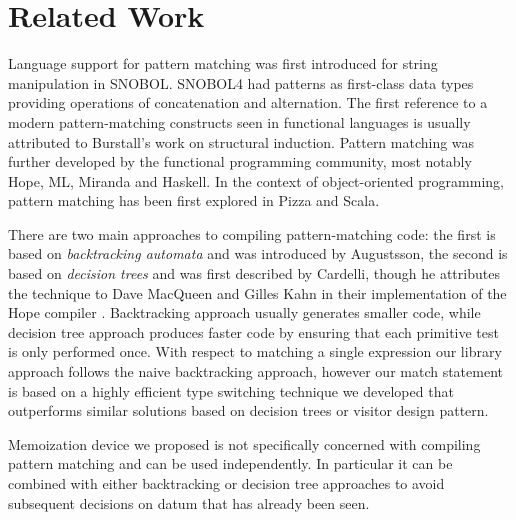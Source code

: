 \section{Related Work} %
\label{sec:rw}

Language support for pattern matching was first introduced for string 
manipulation in SNOBOL\cite{SNOBOL64}. SNOBOL4 had patterns as first-class data 
types providing operations of concatenation and alternation\cite{SNOBOL71}. The 
first reference to a modern pattern-matching constructs seen in functional 
languages is usually attributed to Burstall's work on structural 
induction\cite{Burstall69provingproperties}. Pattern matching was further 
developed by the functional programming community, most notably 
Hope\cite{BMS80}, ML\cite{ML90}, Miranda\cite{Miranda85} and 
Haskell\cite{Haskell98Book}. In the context of object-oriented programming, 
pattern matching has been first explored in Pizza\cite{Odersky97pizzainto} and 
Scala\cite{Scala2nd,EmirThesis}.

There are two main approaches to compiling pattern-matching code: the first is 
based on \emph{backtracking automata} and was introduced by Augustsson\cite{Augustsson85}, 
the second is based on \emph{decision trees} and was first described by 
Cardelli\cite{Cardelli84}, though he attributes the technique to Dave MacQueen 
and Gilles Kahn in their implementation of the Hope compiler \cite{BMS80}.
Backtracking approach usually generates smaller code, while decision tree 
approach produces faster code by ensuring that each primitive test is only 
performed once. With respect to matching a single expression our library 
approach follows the naive backtracking approach, however our match statement is 
based on a highly efficient type switching technique we developed\cite{TypeSwitch} 
that outperforms similar solutions based on decision trees or visitor design pattern.

Memoization device we proposed is not specifically concerned with compiling 
pattern matching and can be used independently. In particular it can be combined 
with either backtracking or decision tree approaches to avoid subsequent 
decisions on datum that has already been seen.


